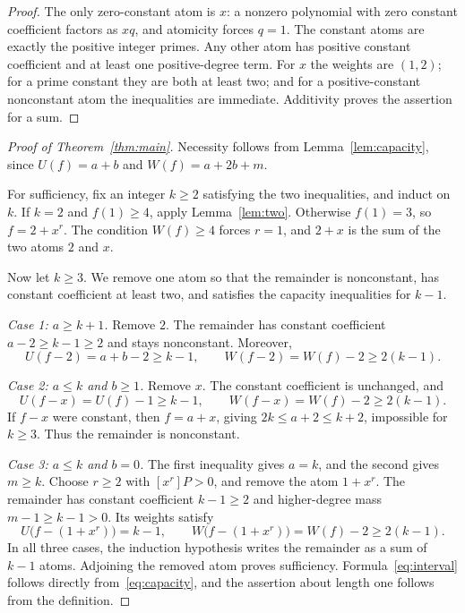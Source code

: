 \documentclass[11pt]{amsart}
\newcommand{\coeff}[2]{[x^{#1}]#2}
\theoremstyle{definition}
\theoremstyle{remark}
\begin{document}
\begin{proof}
The only zero-constant atom is $x$: a nonzero polynomial with zero
constant coefficient factors as $xq$, and atomicity forces $q=1$.
The constant atoms are exactly the positive integer primes. Any other
atom has positive constant coefficient and at least one positive-degree
term. For $x$ the weights are $(1,2)$; for a prime constant they are
both at least two; and for a positive-constant nonconstant atom the
inequalities are immediate. Additivity proves the assertion for a sum.
\end{proof}

\begin{proof}[Proof of Theorem~\ref{thm:main}]
Necessity follows from Lemma~\ref{lem:capacity}, since $U(f)=a+b$ and
$W(f)=a+2b+m$.

For sufficiency, fix an integer $k\ge2$ satisfying the two inequalities,
and induct on $k$. If $k=2$ and $f(1)\ge4$, apply Lemma~\ref{lem:two}.
Otherwise $f(1)=3$, so $f=2+x^r$. The condition $W(f)\ge4$ forces
$r=1$, and $2+x$ is the sum of the two atoms $2$ and $x$.

Now let $k\ge3$. We remove one atom so that the remainder is
nonconstant, has constant coefficient at least two, and satisfies the
capacity inequalities for $k-1$.

\smallskip
\noindent\textit{Case 1: $a\ge k+1$.}
Remove $2$. The remainder has constant coefficient
$a-2\ge k-1\ge2$ and stays nonconstant. Moreover,
\[
U(f-2)=a+b-2\ge k-1,\qquad
W(f-2)=W(f)-2\ge2(k-1).
\]

\smallskip
\noindent\textit{Case 2: $a\le k$ and $b\ge1$.}
Remove $x$. The constant coefficient is unchanged, and
\[
U(f-x)=U(f)-1\ge k-1,\qquad
W(f-x)=W(f)-2\ge2(k-1).
\]
If $f-x$ were constant, then $f=a+x$, giving
$2k\le a+2\le k+2$, impossible for $k\ge3$. Thus the remainder is
nonconstant.

\smallskip
\noindent\textit{Case 3: $a\le k$ and $b=0$.}
The first inequality gives $a=k$, and the second gives $m\ge k$.
Choose $r\ge2$ with $\coeff rP>0$, and remove the atom $1+x^r$.
The remainder has constant coefficient $k-1\ge2$ and higher-degree
mass $m-1\ge k-1>0$. Its weights satisfy
\[
U\bigl(f-(1+x^r)\bigr)=k-1,\qquad
W\bigl(f-(1+x^r)\bigr)=W(f)-2\ge2(k-1).
\]
In all three cases, the induction hypothesis writes the remainder as a
sum of $k-1$ atoms. Adjoining the removed atom proves sufficiency.
Formula~\eqref{eq:interval} follows directly from~\eqref{eq:capacity},
and the assertion about length one follows from the definition.
\end{proof}
\end{document}
